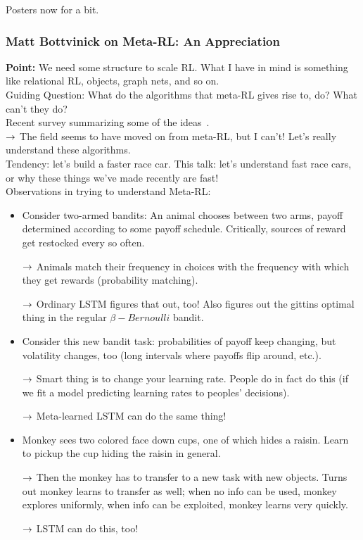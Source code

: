 Posters now for a bit.





\subsubsection{Matt Bottvinick on Meta-RL: An Appreciation}

{\bf Point:} We need some structure to scale RL. What I have in mind is something like relational RL, objects, graph nets, and so on. \\

Guiding Question: What do the algorithms that meta-RL gives rise to, do? What can't they do? \\

Recent survey summarizing some of the ideas~\citet{botvinick2019reinforcement}. \\

$\rightarrow$ The field seems to have moved on from meta-RL, but I can't! Let's really understand these algorithms. \\

Tendency: let's build a faster race car. This talk: let's understand fast race cars, or why these things we've made recently are fast! \\

Observations in trying to understand Meta-RL:
\begin{itemize}
    \item Consider two-armed bandits: An animal chooses between two arms, payoff determined according to some payoff schedule. Critically, sources of reward get restocked every so often. 
    
    $\rightarrow$ Animals match their frequency in choices with the frequency with which they get rewards (probability matching).
    
    $\rightarrow$ Ordinary LSTM figures that out, too! Also figures out the gittins optimal thing in the regular $\beta-Bernoulli$ bandit.
    
    \item Consider this new bandit task: probabilities of payoff keep changing, but volatility changes, too (long intervals where payoffs flip around, etc.).
    
    $\rightarrow$ Smart thing is to change your learning rate. People do in fact do this (if we fit a model predicting learning rates to peoples' decisions).
    
    $\rightarrow$ Meta-learned LSTM can do the same thing!
    
    \item Monkey sees two colored face down cups, one of which hides a raisin. Learn to pickup the cup hiding the raisin in general.
    
    $\rightarrow$ Then the monkey has to transfer to a new task with new objects. Turns out monkey learns to transfer as well; when no info can be used, monkey explores uniformly, when info can be exploited, monkey learns very quickly.
    
    $\rightarrow$ LSTM can do this, too!
\end{itemize}


